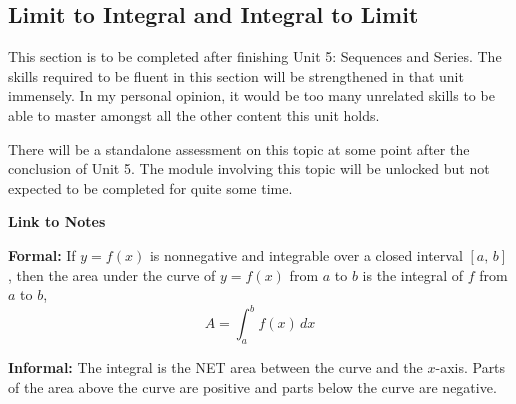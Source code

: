 \subsection*{Limit to Integral and Integral to Limit}
This section is to be completed after finishing Unit 5: Sequences and Series. The skills required to be fluent in this section will be strengthened in that unit immensely. In my personal opinion, it would be too many unrelated skills to be able to master amongst all the other content this unit holds.

There will be a standalone assessment on this topic at some point after the conclusion of Unit 5. The module involving this topic will be unlocked but not expected to be completed for quite some time.

\begin{center}
    \hspace{0pt}
    \vfill
    \textbf{Link to Notes}
    \vspace{.7cm}
    
    \vfill
    \hspace{0pt}
\end{center}

\newpage

\begin{tcolorbox}[title= DEFINITION OF THE DEFINITE INTEGRAL,colframe=black,sharp corners,colback=white,colbacktitle=white,coltitle=black,boxrule=1pt]

     \textbf{Formal:} If $y=f(x)$ is nonnegative and integrable over a closed interval $[a,\,b]$, then the area under the curve of $y=f(x)$ from $a$ to $b$ is the integral of $f$ from $a$ to $b$,
     \[A=\int_a^b f(x)\,dx\]
     
     \textbf{Informal:} The integral is the NET area between the curve and the $x$-axis. Parts of the area above the curve are positive and parts below the curve are negative.
    
\end{tcolorbox}

